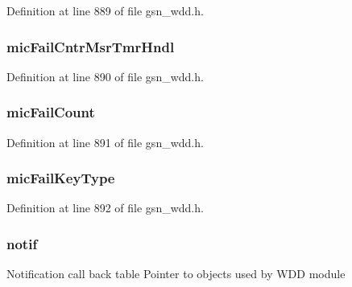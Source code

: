 Definition at line 889 of file gsn\_\-wdd.h.

\hypertarget{a00108_a1cdf001bbd447a958d6b1328c1a28c41}{
\subsubsection[{micFailCntrMsrTmrHndl}]{ {\bf micFailCntrMsrTmrHndl}}}
\label{a00108_a1cdf001bbd447a958d6b1328c1a28c41}


Definition at line 890 of file gsn\_\-wdd.h.

\hypertarget{a00108_af6a8c884eb70e7571ac6430c63ec5df4}{
\subsubsection[{micFailCount}]{ {\bf micFailCount}}}
\label{a00108_af6a8c884eb70e7571ac6430c63ec5df4}


Definition at line 891 of file gsn\_\-wdd.h.

\hypertarget{a00108_a3698e45da8aee10ecc705544d6a08d67}{
\subsubsection[{micFailKeyType}]{ {\bf micFailKeyType}}}
\label{a00108_a3698e45da8aee10ecc705544d6a08d67}


Definition at line 892 of file gsn\_\-wdd.h.

\hypertarget{a00108_ad0e2e453e7dd75d17b37b4a5267f616c}{
\subsubsection[{notif}]{ {\bf notif}}}
\label{a00108_ad0e2e453e7dd75d17b37b4a5267f616c}
Notification call back table Pointer to objects used by WDD module 

